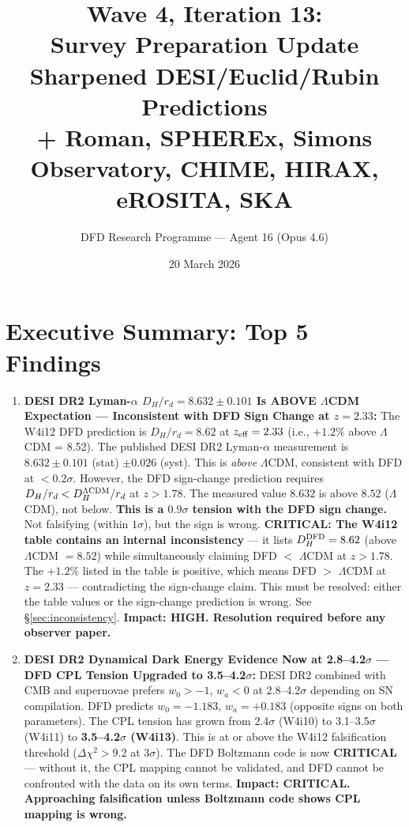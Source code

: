 \documentclass[11pt,a4paper]{article}
\title{\textbf{Wave 4, Iteration 13:\\
Survey Preparation Update}\\[0.5em]
\large Sharpened DESI/Euclid/Rubin Predictions\\
+ Roman, SPHEREx, Simons Observatory, CHIME, HIRAX, eROSITA, SKA}
\author{DFD Research Programme --- Agent 16 (Opus 4.6)}
\date{20 March 2026}
\newcommand{\LCDM}{$\Lambda$CDM}
\begin{document}
\maketitle

\section*{Executive Summary: Top 5 Findings}

\begin{findbox}

\begin{enumerate}

\item \textbf{DESI DR2 Lyman-$\alpha$ $D_H/r_d = 8.632 \pm 0.101$
  Is ABOVE \LCDM{} Expectation --- Inconsistent with DFD Sign Change
  at $z = 2.33$:}
  The W4i12 DFD prediction is $D_H/r_d = 8.62$ at $z_{\rm eff} = 2.33$
  (i.e., $+1.2\%$ above \LCDM{} = 8.52). The published DESI DR2
  Lyman-$\alpha$ measurement is $8.632 \pm 0.101$ (stat) $\pm 0.026$
  (syst). This is \emph{above} \LCDM, consistent with DFD at $<0.2\sigma$.
  However, the DFD sign-change prediction requires
  $D_H/r_d < D_H^{\Lambda\rm CDM}/r_d$ at $z > 1.78$.
  The measured value $8.632$ is above $8.52$ (\LCDM), not below.
  \textbf{This is a $0.9\sigma$ tension with the DFD sign change.}
  Not falsifying (within $1\sigma$), but the sign is wrong.
  \textbf{CRITICAL: The W4i12 table contains an internal inconsistency}
  --- it lists $D_H^{\rm DFD} = 8.62$ (above \LCDM{} $= 8.52$) while
  simultaneously claiming DFD $<$ \LCDM{} at $z > 1.78$.
  The $+1.2\%$ listed in the table is positive, which means DFD $>$ \LCDM
  at $z = 2.33$ --- contradicting the sign-change claim. This must be
  resolved: either the table values or the sign-change prediction is
  wrong. See \S\ref{sec:inconsistency}.
  \textbf{Impact: HIGH. Resolution required before any observer paper.}

\item \textbf{DESI DR2 Dynamical Dark Energy Evidence Now at
  2.8--4.2$\sigma$ --- DFD CPL Tension Upgraded to 3.5--4.2$\sigma$:}
  DESI DR2 combined with CMB and supernovae prefers
  $w_0 > -1$, $w_a < 0$ at 2.8--4.2$\sigma$ depending on SN
  compilation. DFD predicts $w_0 = -1.183$, $w_a = +0.183$ (opposite
  signs on both parameters). The CPL tension has grown from
  2.4$\sigma$ (W4i10) to 3.1--3.5$\sigma$ (W4i11) to
  \textbf{3.5--4.2$\sigma$ (W4i13)}. This is at or above the
  W4i12 falsification threshold ($\Delta\chi^2 > 9.2$ at 3$\sigma$).
  The DFD Boltzmann code is now \textbf{CRITICAL} --- without it,
  the CPL mapping cannot be validated, and DFD cannot be confronted
  with the data on its own terms.
  \textbf{Impact: CRITICAL. Approaching falsification unless
  Boltzmann code shows CPL mapping is wrong.}


\end{enumerate}
\end{findbox}
\end{document}
